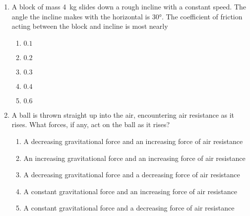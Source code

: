 \documentclass{../../oss-apphys}
\begin{document}
\begin{multicols}{2}
\begin{enumerate}[resume,leftmargin=18pt]
  \item A block of mass \SI{4}{\kilo\gram} slides down a rough incline with a
    constant speed. The angle the incline makes with the horizontal is
    \ang{30}. The coefficient of friction acting between the block and incline
    is most nearly
    \begin{center}
    \end{center}
    \begin{enumerate}[noitemsep,topsep=0pt,leftmargin=18pt,label=(\Alph*)]
    \item $0.1$
    \item $0.2$
    \item $0.3$
    \item $0.4$
    \item $0.6$
    \end{enumerate}


  \item A ball is thrown straight up into the air, encountering air resistance
    as it rises. What forces, if any, act on the ball as it rises?
    \begin{enumerate}[noitemsep,topsep=0pt,leftmargin=18pt,label=(\Alph*)]
    \item A decreasing gravitational force and an increasing force of air
      resistance
    \item An increasing gravitational force and an increasing force of air
      resistance
    \item A decreasing gravitational force and a decreasing force of air
      resistance
    \item A constant gravitational force and an increasing force of air
      resistance
    \item A constant gravitational force and a decreasing force of air
      resistance
    \end{enumerate}
    

\end{enumerate}
\end{multicols}
\end{document}

